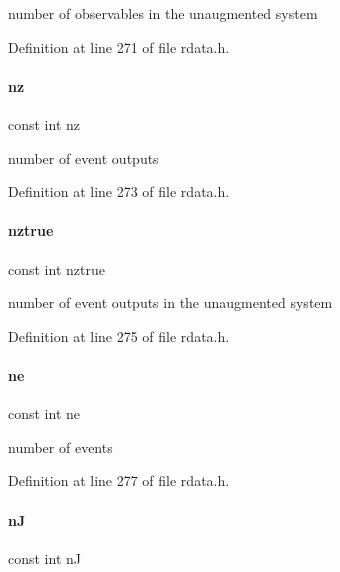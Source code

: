 number of observables in the unaugmented system 

Definition at line 271 of file rdata.\+h.

\mbox{\label{classamici_1_1_return_data_aa406c307f97060d218bc1fe594dfd08f}} 
\paragraph{\texorpdfstring{nz}{nz}}
{\footnotesize\ttfamily const int nz}

number of event outputs 

Definition at line 273 of file rdata.\+h.

\mbox{\label{classamici_1_1_return_data_a9a451378ba5572ef7a3fd4dd89e1c227}} 
\paragraph{\texorpdfstring{nztrue}{nztrue}}
{\footnotesize\ttfamily const int nztrue}

number of event outputs in the unaugmented system 

Definition at line 275 of file rdata.\+h.

\mbox{\label{classamici_1_1_return_data_a07d5274358ec39bfec473cd212a3cb78}} 
\paragraph{\texorpdfstring{ne}{ne}}
{\footnotesize\ttfamily const int ne}

number of events 

Definition at line 277 of file rdata.\+h.

\mbox{\label{classamici_1_1_return_data_a0d2f49d2b15b08628451261e52f56e4f}} 
\paragraph{\texorpdfstring{nJ}{nJ}}
{\footnotesize\ttfamily const int nJ}

